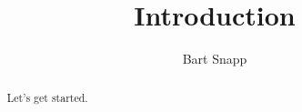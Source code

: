 \documentclass[handout,nooutcomes,noauthor]{ximera}
\title{Introduction}
\author{Bart Snapp}
\begin{document}
\begin{abstract}
  Let's get started.
\end{abstract}
\maketitle


\begin{listOutcomes}
\item 
\end{listOutcomes}
\end{document}
